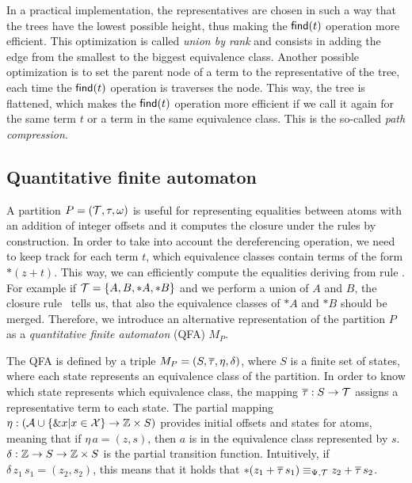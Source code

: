 In a practical implementation, the representatives are chosen in such a way that the trees have the lowest possible height,
thus making the $\textsf{find}(t)$ operation more efficient.
This optimization is called \emph{union by rank} and consists in adding the edge from
the smallest to the biggest equivalence class.
Another possible optimization is to set the parent node of a term to the representative of the tree,
each time the $\textsf{find}(t)$ operation is traverses the node.
This way, the tree is flattened, which makes the $\textsf{find}(t)$ operation
more efficient if we call it again for the same term $t$ or a term in the same equivalence class.
This is the so-called \emph{path compression}.~\cite{uf-tarjan}

\subsection{Quantitative finite automaton}\label{subsection:qfa}

A partition $P = (\mathcal{T}, \tau, \omega)$ is useful for representing equalities between atoms
with an addition of integer offsets and it computes the closure under the rules
by construction.
In order to take into account the dereferencing operation, we need to
keep track for each term $t$, which equivalence classes contain terms of the form $*(z+t)$.
This way, we can efficiently compute the equalities deriving from rule .
For example if $\mathcal{T} = \{A, B, *A, *B\}$ and we perform a union of $A$ and $B$, the
closure rule~ tells us, that also the equivalence classes of $*A$ and $*B$ should be merged.
Therefore, we introduce an alternative representation of the partition $P$ as a \emph{quantitative finite automaton} (QFA) $M_P$.

The QFA is defined by a triple $M_P = (S, \overline{\tau}, \eta, \delta)$, where $S$ is a finite set of states, where each state represents an equivalence class of the partition.
In order to know which state represents which equivalence class, the mapping $\overline{\tau} : S \rightarrow \mathcal{T}$
assigns a representative term to each state.
The partial mapping $\eta : (\mathcal{A} \cup \{\&x | x \in \mathcal{X}\} \rightarrow \mathbb{Z} \times S)$ provides initial offsets and states for atoms, meaning that if $\eta\,a = (z,s)$, then $a$ is in the equivalence class represented by $s$.
$\delta : \mathbb{Z} \rightarrow S \rightarrow \mathbb{Z} \times S$ is the partial transition function.
Intuitively, if $\delta\,z_1\,s_1 = (z_2, s_2)$, this means that it holds that $*(z_1 + \overline{\tau}\,s_1) \equiv_{\Psi,\mathcal{T}} z_2 + \overline{\tau}\,s_2$.

